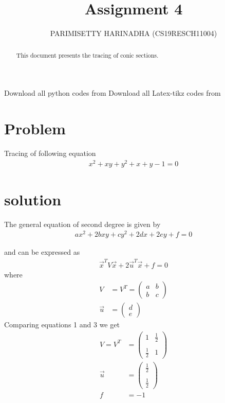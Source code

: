 \documentclass[journal,12pt,twocolumn]{IEEEtran}
\title{Assignment 4}
\author{PARIMISETTY HARINADHA (CS19RESCH11004)}
\newcommand{\myvec}[1]{\ensuremath{\begin{pmatrix}#1\end{pmatrix}}}
\begin{document}
\maketitle
\newpage
\begin{abstract}
This document presents the tracing of conic sections.
\end{abstract}
Download all python codes from 
Download all Latex-tikz codes from 
\section{Problem}
Tracing of following equation
\begin{align}
    x^2+xy+y^2+x+y-1=0 
\end{align}
\section{solution}
The general equation of second degree is given by
\begin{align}
ax^2+2bxy+cy^2+2dx+2ey+f=0
\end{align}

and can be expressed as
\begin{align}
\vec{x}^T V\vec{x}+2\vec{u}^T\vec{x}+f=0 
\end{align}
where
\begin{align}
V &= V^T = \myvec{a & b \\ b & c}
\\
\vec{u} &= \myvec{d \\ e}
\end{align}
Comparing equations 1 and 3 we get
\begin{align}
V=V^T&=\myvec{1 & \frac{1}{2} \\\\ \frac{1}{2} &1} \\
    \vec{u}&=\myvec{\frac{1}{2} \\\\\frac{1}{2} } \\
    f&=-1
\end{align}   
\end{document}
